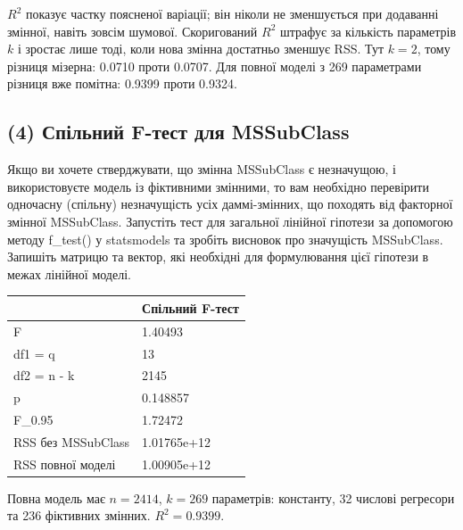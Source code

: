 \(R^2\) показує частку поясненої варіації; він ніколи не зменшується при
додаванні змінної, навіть зовсім шумової. Скори\-гований \(R^2\) штрафує
за кількість параметрів \(k\) і зростає лише тоді, коли нова змінна
достатньо зменшує RSS. Тут \(k=2\), тому різниця мізерна: 0.0710 проти
0.0707. Для повної моделі з 269 параметрами різниця вже помітна: 0.9399
проти 0.9324.


\Needspace{225.0pt}

\subsection{(4) Спільний F-тест для MSSubClass}

\begin{taskstatement}
Якщо ви хочете стверджувати, що змінна MSSubClass є незначущою, і
використовуєте модель із фіктивними змінними, то вам необхідно
перевірити одночасну (спільну) незначущість усіх даммі-змінних, що
походять від факторної змінної MSSubClass. Запустіть тест для загальної
лінійної гіпотези за допомогою методу f\_test() у statsmodels та зробіть
висновок про значущість MSSubClass. Запишіть матрицю та вектор, які
необхідні для формулювання цієї гіпотези в межах лінійної моделі.
\end{taskstatement}



\Needspace{56.0pt}


\begingroup\fontsize{7.5}{9.5}\selectfont\setlength{\tabcolsep}{2.5mm}\renewcommand{\arraystretch}{1.15}
\par\vspace{2pt}\noindent\begin{tabular}{|ll|}
\hline
 & Спільний F-тест \\
\hline
F & 1.40493 \\
df1 = q & 13 \\
df2 = n - k & 2145 \\
p & 0.148857 \\
F\_0.95 & 1.72472 \\
RSS без MSSubClass & 1.01765e+12 \\
RSS повної моделі & 1.00905e+12 \\
\hline
\end{tabular}\par\vspace{2pt}
\endgroup


\answerheading
Повна модель має \(n=2414\), \(k=269\) параметрів: константу, 32 числові
регресори та 236 фіктивних змінних. \(R^2=0.9399\).

